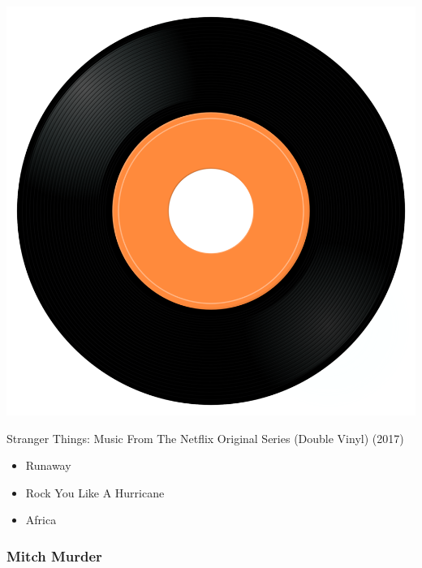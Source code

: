 \begin{minipage}[t]{0.25\textwidth}\vspace{0pt}
\captionsetup{type=figure}
\includegraphics[width=\textwidth]{Images/cover.png}
\caption*{Stranger Things: Music From The Netflix Original Series (Double Vinyl) (2017)}
\end{minipage}
\begin{minipage}[t]{0.25\textwidth}\vspace{0pt}
\begin{itemize}[nosep,leftmargin=1em,labelwidth=*,align=left]
	\setlength{\itemsep}{0pt}
	\item Runaway
	\item Rock You Like A Hurricane
	\item Africa
\end{itemize}
\end{minipage}

\subsubsection{Mitch Murder}

